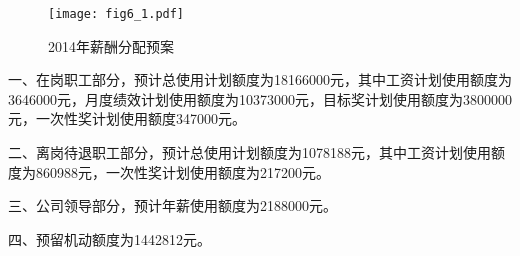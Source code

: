 \begin{figure}[htbp]
  \centering
  \texttt{[image: fig6\_1.pdf]}
  \caption{2014年薪酬分配预案}
  \label{figure2}
\end{figure}

一、在岗职工部分，预计总使用计划额度为18166000元，其中工资计划使用额度为3646000元，月度绩效计划使用额度为10373000元，目标奖计划使用额度为3800000元，一次性奖计划使用额度347000元。

二、离岗待退职工部分，预计总使用计划额度为1078188元，其中工资计划使用额度为860988元，一次性奖计划使用额度为217200元。


三、公司领导部分，预计年薪使用额度为2188000元。

四、预留机动额度为1442812元。




